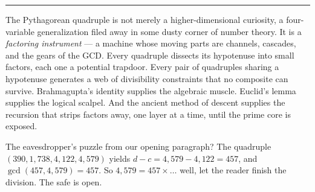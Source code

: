 \bigskip\noindent\rule{\linewidth}{0.4pt}\bigskip

The Pythagorean quadruple is not merely a higher-dimensional curiosity, a four-variable generalization filed away in some dusty corner of number theory. It is a \emph{factoring instrument} --- a machine whose moving parts are channels, cascades, and the gears of the GCD. Every quadruple dissects its hypotenuse into small factors, each one a potential trapdoor. Every pair of quadruples sharing a hypotenuse generates a web of divisibility constraints that no composite can survive. Brahmagupta's identity supplies the algebraic muscle. Euclid's lemma supplies the logical scalpel. And the ancient method of descent supplies the recursion that strips factors away, one layer at a time, until the prime core is exposed.

The eavesdropper's puzzle from our opening paragraph? The quadruple \((390, 1{,}738, 4{,}122, 4{,}579)\) yields \(d - c = 4{,}579 - 4{,}122 = 457\), and \(\gcd(457, 4{,}579) = 457\). So \(4{,}579 = 457 \times \ldots\) well, let the reader finish the division. The safe is open.
